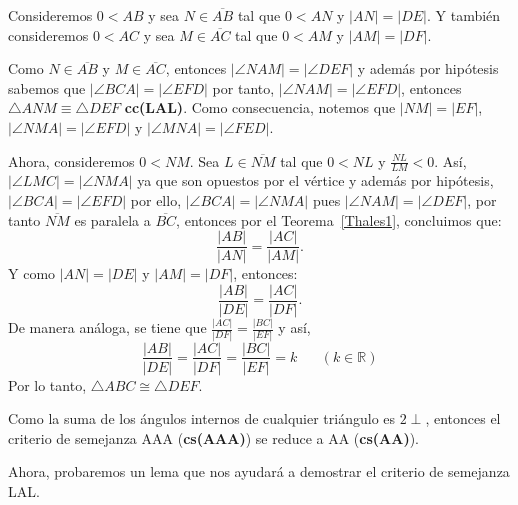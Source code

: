 \begin{dem}
Consideremos $0<AB$ y sea $N \in \overline{AB}$ tal que $0<AN$ y $|AN|=|DE|.$
Y también consideremos $0<AC$ y sea $M \in \overline{AC}$ tal que $0<AM$ y $|AM|=|DF|$.
	
Como $N \in \overline{AB}$  y $M \in \overline{AC}$, entonces  $|\angle NAM|=|\angle DEF|$ y además por hipótesis sabemos que $|\angle BCA|=|\angle EFD|$ por tanto, $|\angle NAM|=|\angle EFD|$, entonces $\triangle ANM \equiv \triangle DEF$ \textbf{cc(LAL)}. Como consecuencia, notemos que $|NM|=|EF|$,  $|\angle NMA|=|\angle EFD|$ y  $|\angle MNA|=|\angle FED|.$

Ahora, consideremos $0<NM$. Sea $L \in \overline{NM}$ tal que $0<NL$ y $\frac{NL}{LM}<0.$
Así, $|\angle LMC|=|\angle NMA|$  ya que son opuestos por el vértice y además por hipótesis, $|\angle BCA|=|\angle EFD|$ por ello, $|\angle BCA|=|\angle NMA|$ pues $|\angle NAM|=|\angle DEF|$, por tanto $\overline{NM}$ es paralela a $\overline{BC}$, entonces por el Teorema~\ref{Thales1}, concluimos que:
$$ \frac{|AB|}{|AN|}=\frac{|AC|}{|AM|}.$$ 
Y como $|AN|=|DE|$ y $|AM|=|DF|$, entonces:
$$ \frac{|AB|}{|DE|}=\frac{|AC|}{|DF|}.$$ 
De manera análoga, se tiene que $ \frac{|AC|}{|DF|}=\frac{|BC|}{|EF|}$ y así,
$$\frac{|AB|}{|DE|}=\frac{|AC|}{|DF|}=\frac{|BC|}{|EF|}=k \;\;\;\;\;\; (k\in\mathbb{R})$$
Por lo tanto, $\triangle ABC \cong \triangle DEF.$
\end{dem}	 

\begin{cor}
Como la suma de los ángulos internos de cualquier triángulo es $2\perp$, entonces el criterio de semejanza AAA (\textbf{cs(AAA)}) se reduce a AA (\textbf{cs(AA)}).
\end{cor}
	
Ahora, probaremos un lema que nos ayudará a demostrar el criterio de semejanza LAL.


